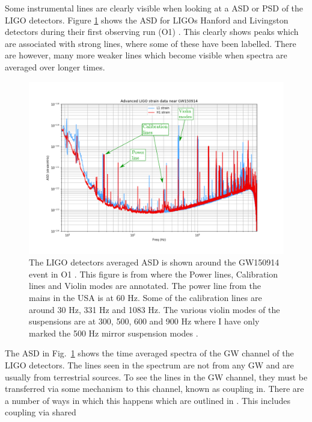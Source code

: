Some instrumental lines are clearly visible when looking at a \gls{ASD} or
\gls{PSD} of the \gls{LIGO} detectors. Figure \ref{detchar:line:psd} shows the
\gls{ASD} for \glspl{LIGO} Hanford and Livingston detectors during their first
observing run (O1) \citep{GWOpen}. This clearly shows peaks which are
associated with strong lines, where some of these have been labelled. There are however, many
more weaker lines which become visible when spectra are averaged over longer
times.
%
\begin{figure} \centering
\includegraphics[width=\textwidth]{C6_detchar/ligo_o1_asd_annot.pdf}
\caption[Strain \gls{ASD} for the \gls{LIGO} detectors.]{
	The \gls{LIGO} detectors averaged \gls{ASD} is shown around the GW150914 event in O1 \citep{abbott2016ObservationGravitational}.
	This figure is from \citep{GWOpen} where the Power lines, Calibration lines and Violin modes are annotated. The
	power line from the mains in the USA is at 60 Hz. Some of the calibration lines
	are around 30 Hz, 331 Hz and 1083 Hz. The various violin modes of the suspensions are at 300, 500, 600 and 900 Hz where I have only marked the 500 Hz mirror suspension modes \citep{GWOpen}.} 
	\label{detchar:line:psd} 
\end{figure}
%
The \gls{ASD} in Fig.~\ref{detchar:line:psd} shows the time averaged spectra
of the \gls{GW} channel of the \gls{LIGO} detectors. The lines seen in the spectrum are not from any \gls{GW}
and are usually from terrestrial sources.  To see the lines in the \gls{GW}
channel, they must be transferred via some mechanism to this channel, known as coupling in.  There are a number of
ways in which this happens which are outlined in
\citep{covas2018IdentificationMitigation}.  This includes coupling via shared
